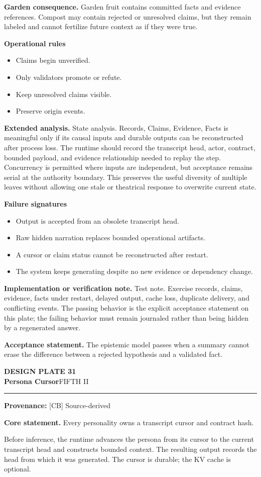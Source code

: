 \documentclass[10pt,letterpaper,oneside]{article}
\newcommand{\prov}[1]{\textcolor{gardenBlue}{\sffamily\footnotesize\textbf{Provenance:} #1}}
\newcommand{\platetitle}[3]{%
  \begin{minipage}[t][0.54in][t]{\textwidth}
  {\sffamily\bfseries\color{gardenDeep}\fontsize{9}{10}\selectfont DESIGN PLATE #1}\\[-1pt]
  {\sffamily\bfseries\color{gardenInk}\fontsize{16.5}{18}\selectfont #2}\hfill{\sffamily\color{gardenGreen}\large #3}
  \end{minipage}\vspace{-2pt}\hrule\vspace{5pt}}
\begin{document}
\textbf{Garden consequence.} Garden fruit contains committed facts and evidence references. Compost may contain rejected or unresolved claims, but they remain labeled and cannot fertilize future context as if they were true.

\textbf{Operational rules}
\begin{itemize}
\item Claims begin unverified.
\item Only validators promote or refute.
\item Keep unresolved claims visible.
\item Preserve origin events.
\end{itemize}
\textbf{Extended analysis.} State analysis. Records, Claims, Evidence, Facts is meaningful only if its causal inputs and durable outputs can be reconstructed after process loss. The runtime should record the transcript head, actor, contract, bounded payload, and evidence relationship needed to replay the step. Concurrency is permitted where inputs are independent, but acceptance remains serial at the authority boundary. This preserves the useful diversity of multiple leaves without allowing one stale or theatrical response to overwrite current state.

\textbf{Failure signatures}
\begin{itemize}
\item Output is accepted from an obsolete transcript head.
\item Raw hidden narration replaces bounded operational artifacts.
\item A cursor or claim status cannot be reconstructed after restart.
\item The system keeps generating despite no new evidence or dependency change.
\end{itemize}
\textbf{Implementation or verification note.} Test note. Exercise records, claims, evidence, facts under restart, delayed output, cache loss, duplicate delivery, and conflicting events. The passing behavior is the explicit acceptance statement on this plate; the failing behavior must remain journaled rather than being hidden by a regenerated answer.

\begin{acceptbox}
\textbf{Acceptance statement.} The epistemic model passes when a summary cannot erase the difference between a rejected hypothesis and a validated fact.
\end{acceptbox}
\newpage
\platetitle{31}{Persona Cursor}{FIFTH II}
\prov{[CB] Source-derived}
\fontsize{8.85}{10.45}\selectfont
\begin{corebox}
\textbf{Core statement.} Every personality owns a transcript cursor and contract hash.
\end{corebox}
Before inference, the runtime advances the persona from its cursor to the current transcript head and constructs bounded context. The resulting output records the head from which it was generated. The cursor is durable; the KV cache is optional.
\end{document}
